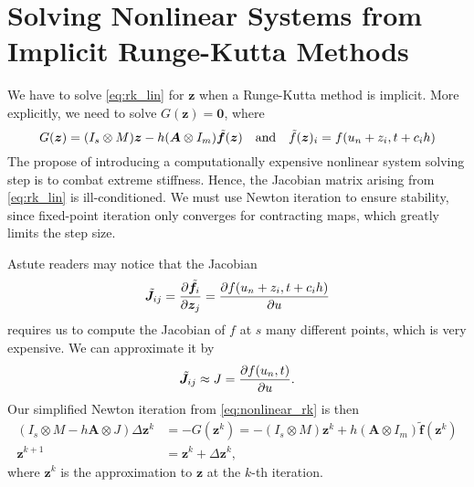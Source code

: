 \documentclass[a4paper,9pt]{article}
\theoremstyle{definition}
\theoremstyle{remark}
\begin{document}
\section{Solving Nonlinear Systems from Implicit Runge-Kutta Methods}
We have to solve \cref{eq:rk_lin} for $\bm{z}$ when a Runge-Kutta method is
implicit. More explicitly, we need to solve $G(\bm{z}) = \bm{0}$, where
\begin{equation} \label{eq:nonlinear_rk}
  G(\bm{z}) = (I_s \otimes M) \bm{z} - h(\bm{A}\otimes I_m) \tilde{\bm{f}}(\bm{z}) \qq{and}
  \tilde{f}(\bm{z})_i = f(u_n+z_i, t+c_i h)
\end{equation}
The propose of introducing a computationally expensive nonlinear
system solving step is to combat extreme stiffness. Hence, the Jacobian matrix
arising from \cref{eq:rk_lin} is ill-conditioned. We must use Newton
iteration to ensure stability, since fixed-point iteration only converges for
contracting maps, which greatly limits the step size.

Astute readers may notice that the Jacobian
\begin{equation}
  \tilde{\bm{J}}_{ij} = \pdv{\tilde{\bm{f}}_i}{\bm{z}_j} = \pdv{f(u_n + z_i, t+c_ih)}{u}
\end{equation}
requires us to compute the Jacobian of $f$ at $s$ many different points, which
is very expensive. We can approximate it by
\begin{equation}
  \tilde{\bm{J}}_{ij} \approx J = \pdv{f(u_n, t)}{u}.
\end{equation}
Our simplified Newton iteration from \cref{eq:nonlinear_rk} is then
\begin{align} \label{eq:newton_1}
  (I_s \otimes M - h\bm{A}\otimes J) \Delta \bm{z}^k &= -G(\bm{z}^k) = -(I_s
  \otimes M) \bm{z}^k + h(\bm{A}\otimes I_m) \tilde{\bm{f}}(\bm{z}^k) \\
  \bm{z}^{k+1} &= \bm{z}^{k} + \Delta \bm{z}^k \label{eq:newton_2},
\end{align}
where $\bm{z}^k$ is the approximation to $\bm{z}$ at the $k$-th iteration.
\end{document}
